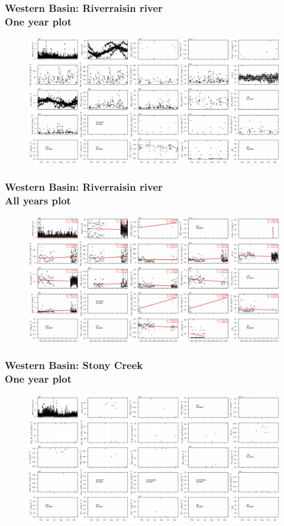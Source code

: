 \documentclass{beamer}
\begin{document}
\begin{frame}
\frametitle{Western Basin: Riverraisin river\\ One year plot}
\begin{figure}
\includegraphics[width=\textwidth]{rivers/Western basin/plot_1yr riverraisin.png}
\end{figure}
\end{frame}

\begin{frame}
\frametitle{Western Basin: Riverraisin river\\ All years plot}
\begin{figure}
\includegraphics[width=\textwidth]{rivers/Western basin/plot_all riverraisin.png}
\end{figure}
\end{frame}

\begin{frame}
\frametitle{Western Basin: Stony Creek\\ One year plot}
\begin{figure}
\includegraphics[width=\textwidth]{rivers/Western basin/plot_1yr stonycreek.png}
\end{figure}
\end{frame}
\end{document}
